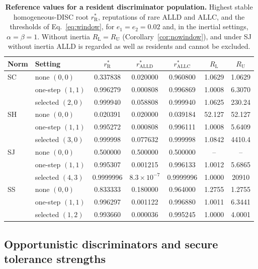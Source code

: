 \documentclass[10pt]{wlscirep}
\newcommand{\rR}{r_{\mathrm{R}}^{*}}
\newcommand{\ALLC}{\mathrm{ALLC}}
\newcommand{\ALLD}{\mathrm{ALLD}}
\theoremstyle{plain}
\theoremstyle{remark}
\begin{document}
\begin{table}[!htbp]
\centering
\caption{\textbf{Reference values for a resident discriminator population.} Highest stable homogeneous-DISC root $\rR$, reputations of rare ALLD and ALLC, and the thresholds of Eq.~\eqref{eq:window}, for $e_1=e_2=0.02$ and, in the inertial settings, $\alpha=\beta=1$. Without inertia $R_{\mathrm L}=R_{\mathrm U}$ (Corollary~\ref{cor:nowindow}), and under SJ without inertia ALLD is regarded as well as residents and cannot be excluded.}
\label{tab:si-thresholds}
\small
\begin{tabular}{@{}llccccc@{}}
\toprule
Norm & Setting & $\rR$ & $r^*_{\ALLD}$ & $r^*_{\ALLC}$ & $R_{\mathrm L}$ & $R_{\mathrm U}$\\
\midrule
SC & none $(0,0)$ & 0.337838 & 0.020000 & 0.960800 & 1.0629 & 1.0629\\
 & one-step $(1,1)$ & 0.996279 & 0.000808 & 0.996869 & 1.0008 & 6.3070\\
 & selected $(2,0)$ & 0.999940 & 0.058808 & 0.999940 & 1.0625 & 230.24\\
SH & none $(0,0)$ & 0.020391 & 0.020000 & 0.039184 & 52.127 & 52.127\\
 & one-step $(1,1)$ & 0.995272 & 0.000808 & 0.996111 & 1.0008 & 5.6409\\
 & selected $(3,0)$ & 0.999998 & 0.077632 & 0.999998 & 1.0842 & 4410.4\\
SJ & none $(0,0)$ & 0.500000 & 0.500000 & 0.500000 & -- & --\\
 & one-step $(1,1)$ & 0.995307 & 0.001215 & 0.996133 & 1.0012 & 5.6865\\
 & selected $(4,3)$ & 0.9999996 & $8.3\times10^{-7}$ & 0.9999996 & 1.0000 & 20910\\
SS & none $(0,0)$ & 0.833333 & 0.180000 & 0.964000 & 1.2755 & 1.2755\\
 & one-step $(1,1)$ & 0.996297 & 0.001122 & 0.996880 & 1.0011 & 6.3441\\
 & selected $(1,2)$ & 0.993660 & 0.000036 & 0.995245 & 1.0000 & 4.0001\\
\bottomrule
\end{tabular}
\end{table}

\subsection{Opportunistic discriminators and secure tolerance strengths}
\label{si:opportunism}
\end{document}

